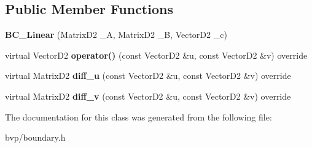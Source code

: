 \subsection*{Public Member Functions}
\begin{DoxyCompactItemize}
\item 
\mbox{\label{classBC__Linear_aaf6acbb563402c281a76c7809c5a9a8e}} 
{\bfseries B\+C\+\_\+\+Linear} (Matrix\+D2 \+\_\+A, Matrix\+D2 \+\_\+B, Vector\+D2 \+\_\+c)
\item 
\mbox{\label{classBC__Linear_a025c57de07ed39bafb89c55733b64642}} 
virtual Vector\+D2 {\bfseries operator()} (const Vector\+D2 \&u, const Vector\+D2 \&v) override
\item 
\mbox{\label{classBC__Linear_ac1acab2a5bea96494677bd93848d59b8}} 
virtual Matrix\+D2 {\bfseries diff\+\_\+u} (const Vector\+D2 \&u, const Vector\+D2 \&v) override
\item 
\mbox{\label{classBC__Linear_ae052ce17da0beeee6d96cf1a8fe26a7a}} 
virtual Matrix\+D2 {\bfseries diff\+\_\+v} (const Vector\+D2 \&u, const Vector\+D2 \&v) override
\end{DoxyCompactItemize}


The documentation for this class was generated from the following file\+:\begin{DoxyCompactItemize}
\item 
bvp/boundary.\+h\end{DoxyCompactItemize}
